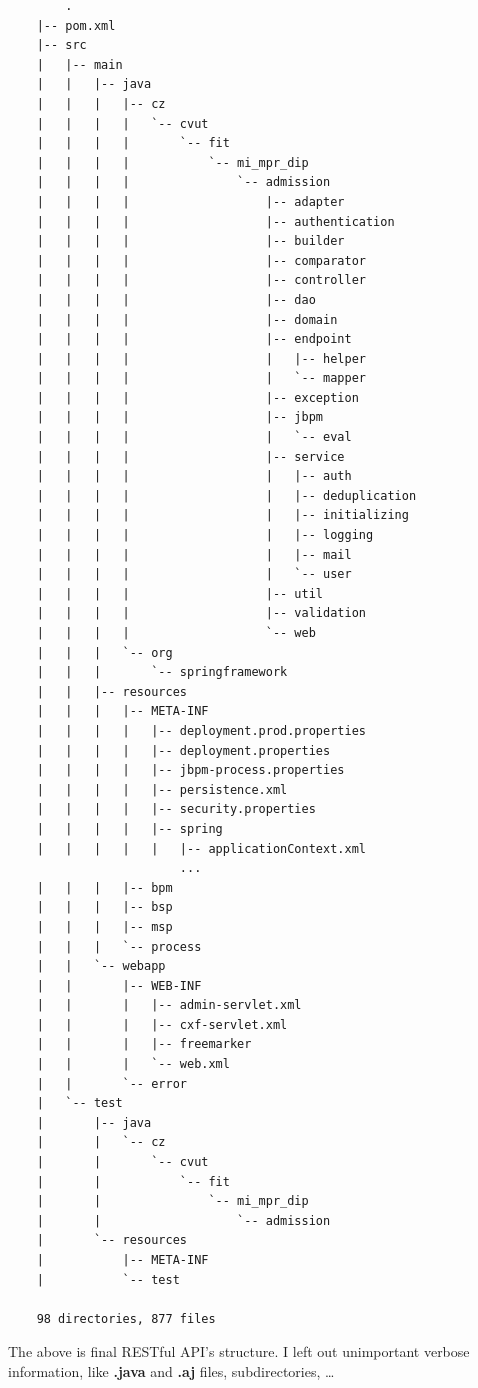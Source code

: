 	\begin{verbatim}
		.
	|-- pom.xml
	|-- src
	|   |-- main
	|   |   |-- java
	|   |   |   |-- cz
	|   |   |   |   `-- cvut
	|   |   |   |       `-- fit
	|   |   |   |           `-- mi_mpr_dip
	|   |   |   |               `-- admission
	|   |   |   |                   |-- adapter
	|   |   |   |                   |-- authentication
	|   |   |   |                   |-- builder
	|   |   |   |                   |-- comparator
	|   |   |   |                   |-- controller
	|   |   |   |                   |-- dao
	|   |   |   |                   |-- domain
	|   |   |   |                   |-- endpoint
	|   |   |   |                   |   |-- helper
	|   |   |   |                   |   `-- mapper
	|   |   |   |                   |-- exception
	|   |   |   |                   |-- jbpm
	|   |   |   |                   |   `-- eval
	|   |   |   |                   |-- service
	|   |   |   |                   |   |-- auth
	|   |   |   |                   |   |-- deduplication
	|   |   |   |                   |   |-- initializing
	|   |   |   |                   |   |-- logging
	|   |   |   |                   |   |-- mail
	|   |   |   |                   |   `-- user
	|   |   |   |                   |-- util
	|   |   |   |                   |-- validation
	|   |   |   |                   `-- web
	|   |   |   `-- org
	|   |   |       `-- springframework
	|   |   |-- resources
	|   |   |   |-- META-INF
	|   |   |   |   |-- deployment.prod.properties
	|   |   |   |   |-- deployment.properties
	|   |   |   |   |-- jbpm-process.properties
	|   |   |   |   |-- persistence.xml
	|   |   |   |   |-- security.properties
	|   |   |   |   |-- spring
	|   |   |   |   |   |-- applicationContext.xml
	                    ...
	|   |   |   |-- bpm
	|   |   |   |-- bsp
	|   |   |   |-- msp
	|   |   |   `-- process
	|   |   `-- webapp
	|   |       |-- WEB-INF
	|   |       |   |-- admin-servlet.xml
	|   |       |   |-- cxf-servlet.xml
	|   |       |   |-- freemarker
	|   |       |   `-- web.xml
	|   |       `-- error
	|   `-- test
	|       |-- java
	|       |   `-- cz
	|       |       `-- cvut
	|       |           `-- fit
	|       |               `-- mi_mpr_dip
	|       |                   `-- admission
	|       `-- resources
	|           |-- META-INF
	|           `-- test
	
	98 directories, 877 files
	\end{verbatim}
	
	The above is final RESTful API's structure. I left out unimportant verbose information, like \textbf{.java} and
	\textbf{.aj} files, subdirectories, \ldots 
	
